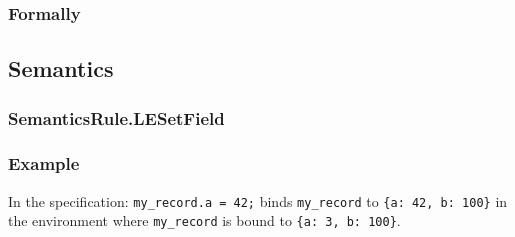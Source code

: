 \subsubsection{Formally}
\begin{mathpar}
\end{mathpar}

\subsection{Semantics}
\hypertarget{SemanticsRule.LESetField}{}
\subsubsection{SemanticsRule.LESetField\label{sec:SemanticsRule.LESetField}}
\subsubsection{Example}
In the specification:
\texttt{my\_record.a = 42;} binds \texttt{my\_record} to \texttt{\{a: 42, b: 100\}} in the environment where \texttt{my\_record} is bound to \texttt{\{a: 3, b: 100\}}.

